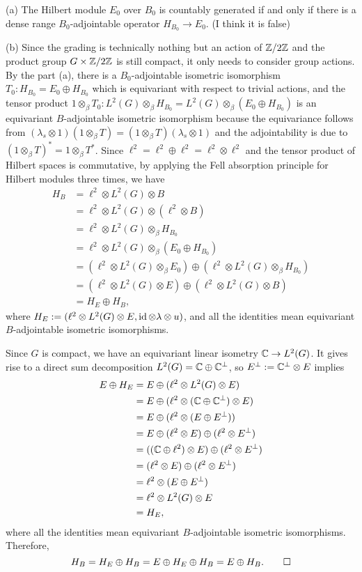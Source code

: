 \documentclass{../../large}
\begin{document}
\begin{pf}
(a)
The Hilbert module $E_0$ over $B_0$ is countably generated if and only if there is a dense range $B_0$-adjointable operator $H_{B_0}\to E_0$. (I think it is false)


(b)
Since the grading is technically nothing but an action of $\mathbb{Z}/2\mathbb{Z}$ and the product group $G\times\mathbb{Z}/2\mathbb{Z}$ is still compact, it only needs to consider group actions.
By the part (a), there is a $B_0$-adjointable isometric isomorphism $T_0:H_{B_0}=E_0\oplus H_{B_0}$ which is equivariant with respect to trivial actions, and the tensor product $1\otimes_\beta T_0:L^2(G)\otimes_\beta H_{B_0}=L^2(G)\otimes_\beta(E_0\oplus H_{B_0})$ is an equivariant $B$-adjointable isometric isomorphism because the equivariance follows from $(\lambda_s\otimes1)(1\otimes_\beta T)=(1\otimes_\beta T)(\lambda_s\otimes1)$ and the adjointability is due to $(1\otimes_\beta T)^*=1\otimes_\beta T^*$.
Since $\ell^2=\ell^2\oplus\ell^2=\ell^2\otimes\ell^2$ and the tensor product of Hilbert spaces is commutative, by applying the Fell absorption principle for Hilbert modules three times, we have
\begin{align*}
H_B
&=\ell^2\otimes L^2(G)\otimes B\\
&=\ell^2\otimes L^2(G)\otimes(\ell^2\otimes B)\\
&=\ell^2\otimes L^2(G)\otimes_\beta H_{B_0}\\
&=\ell^2\otimes L^2(G)\otimes_\beta(E_0\oplus H_{B_0})\\
&=(\ell^2\otimes L^2(G)\otimes_\beta E_0)\oplus(\ell^2\otimes L^2(G)\otimes_\beta H_{B_0})\\
&=(\ell^2\otimes L^2(G)\otimes E)\oplus(\ell^2\otimes L^2(G)\otimes B)\\
&=H_E\oplus H_B,
\end{align*}
where $H_E:=(\ell^2\otimes L^2(G)\otimes E,\operatorname{id}\otimes\lambda\otimes u)$, and all the identities mean equivariant $B$-adjointable isometric isomorphisms.

Since $G$ is compact, we have an equivariant linear isometry $\mathbb{C}\to L^2(G)$.
It gives rise to a direct sum decomposition $L^2(G)=\mathbb{C}\oplus \mathbb{C}^\perp$, so $E^\perp:=\mathbb{C}^\perp\otimes E$ implies
\begin{align*}
E\oplus H_E
&=E\oplus(\ell^2\otimes L^2(G)\otimes E)\\
&=E\oplus(\ell^2\otimes(\mathbb{C}\oplus\mathbb{C}^\perp)\otimes E)\\
&=E\oplus(\ell^2\otimes(E\oplus E^\perp))\\
&=E\oplus(\ell^2\otimes E)\oplus(\ell^2\otimes E^\perp)\\
&=((\mathbb{C}\oplus\ell^2)\otimes E)\oplus(\ell^2\otimes E^\perp)\\
&=(\ell^2\otimes E)\oplus(\ell^2\otimes E^\perp)\\
&=\ell^2\otimes(E\oplus E^\perp)\\
&=\ell^2\otimes L^2(G)\otimes E\\
&=H_E,
\end{align*}
where all the identities mean equivariant $B$-adjointable isometric isomorphisms.
Therefore,
\[H_B=H_E\oplus H_B=E\oplus H_E\oplus H_B=E\oplus H_B.\qedhere\]
\end{pf}
\end{document}
